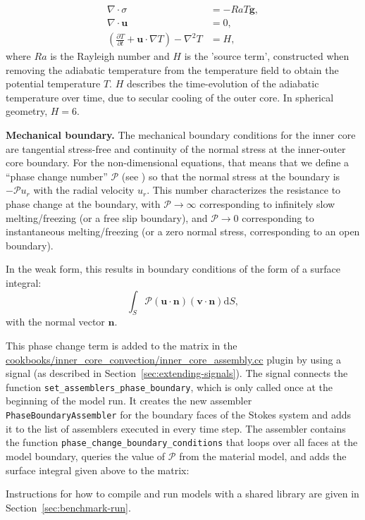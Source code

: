 \documentclass{article}
\begin{document}
\begin{align}
  \label{eq:inner-core-1}
  \nabla \cdot \sigma &=
  -Ra T \mathbf g,
  \\
  \label{eq:inner-core-2}
  \nabla \cdot \mathbf u &= 0,
  \\
  \label{eq:inner-core-3}
  \left(\frac{\partial T}{\partial t} + \mathbf u\cdot\nabla T\right)
  - \nabla^2 T
  &=
  H,
\end{align}
where $Ra$ is the Rayleigh number and $H$ is the 'source term', constructed when removing the adiabatic temperature from the temperature field to obtain the potential temperature $T$. $H$ describes the time-evolution of the adiabatic temperature over time, due to secular cooling of the outer core. 
In spherical geometry, $H=6$. 


\vspace{0.3cm}
\textbf{Mechanical boundary.}
The mechanical boundary conditions for the inner core are
tangential stress-free and continuity of the normal stress at the
inner-outer core boundary. For the non-dimensional equations, that
means that we define a ``phase change number'' $\mathcal{P}$ (see \cite{Deguen2013}) so that the
normal stress at the boundary is $-\mathcal{P} u_r$ with the radial velocity
$u_r$. This number characterizes the resistance to phase change at
the boundary, with $\mathcal{P}\rightarrow\infty$ corresponding to infinitely slow
melting/freezing (or a free slip boundary), and $\mathcal{P}\rightarrow0$ corresponding to
instantaneous melting/freezing (or a zero normal stress, corresponding to an open boundary).

In the weak form, this results in boundary conditions of the form
of a surface integral:
\begin{equation*}
\int_S \mathcal{P} (\mathbf u \cdot \mathbf n) (\mathbf v \cdot \mathbf n) \text{d}S,
\end{equation*}
with the normal vector $\mathbf n$.

This phase change term is added to the matrix in the 
\url{cookbooks/inner_core_convection/inner_core_assembly.cc} plugin by using a signal 
(as described in Section~\ref{sec:extending-signals}). The signal 
connects the function \verb!set_assemblers_phase_boundary!, which is only called once at the beginning of 
the model run. It creates the new assembler \texttt{PhaseBoundaryAssembler} for the boundary faces of the Stokes 
system and adds it to the list of assemblers executed in every time step. 
The assembler contains the function \verb!phase_change_boundary_conditions! that loops over all faces at the model 
boundary, queries the value of $\mathcal{P}$ from the material model, and adds the surface integral given above
to the matrix:

Instructions for how to compile and run models with a shared library are given in Section~\ref{sec:benchmark-run}.
\end{document}
